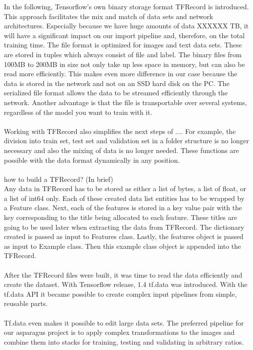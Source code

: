 In the following, Tensorflow's own binary storage format TFRecord is introduced. This approach facilitates the mix and match of data sets and network architectures. Especially because we have huge amounts of data XXXXXX TB, it will have a significant impact on our import pipeline and, therefore, on the total training time. The file format is optimized for images and text data sets. These are stored in tuples which always consist of file and label. The binary files from 100MB to 200MB in size not only take up less space in memory, but can also be read more efficiently. This makes even more difference in our case because the data is stored in the network and not on an SSD hard disk on the PC. The serialized file format allows the data to be streamed efficiently through the network. Another advantage is that the file is transportable over several systems, regardless of the model you want to train with it. \\
\\
Working with TFRecord also simplifies the next steps of .... For example, the division into train set, test set and validation set in a folder structure is no longer necessary and also the mixing of data is no longer needed. These functions are possible with the data format dynamically in any position.  \\
\\
how to build a TFRecord? (In brief) \\
Any data in TFRecord has to be stored as either a list of bytes, a list of float, or a list of int64 only. Each of these created data list entities has to be wrapped by a Feature class. Next, each of the features is stored in a key value pair with the key corresponding to the title being allocated to each feature. These titles are going to be used later when extracting the data from TFRecord. The dictionary created is passed as input to Features class. Lastly, the features object is passed as input to Example class. Then this example class object is appended into the TFRecord. \\
\\
After the TFRecord files were built, it was time to read the data efficiently and create the dataset. With Tensorflow release, 1.4 tf.data was introduced. With the tf.data API it became possible to create complex input pipelines from simple, reusable parts.\\
\\
Tf.data even makes it possible to edit large data sets. The preferred pipeline for our asparagus project is to apply complex transformations to the images and combine them into stacks for training, testing and validating in arbitrary ratios. \\
